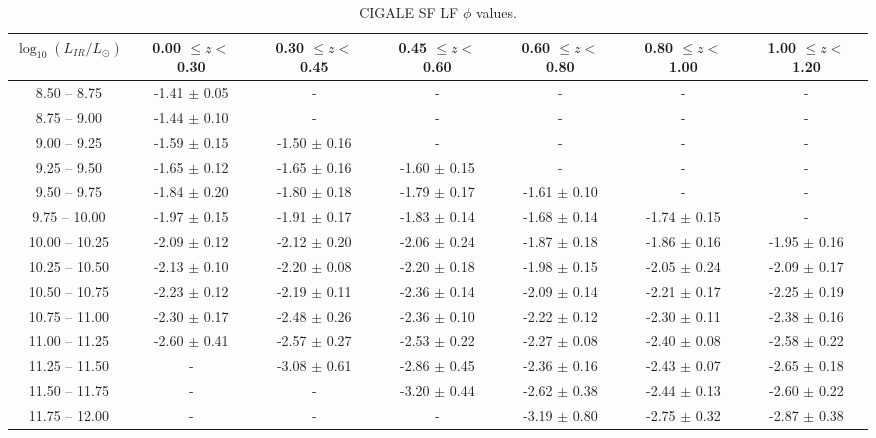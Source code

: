 \begin{table*}
    \begin{center}
    \caption{CIGALE SF LF $\phi$ values.}
    \label{Tab: CG SF LF}
    \begin{tabular}{@{}ccccccc@{}}
        \toprule
        $\log_{10}(L_{IR}/L_{\odot})$ & 0.00 $\leq z <$ 0.30 & 0.30 $\leq z <$ 0.45 & 0.45 $\leq z <$ 0.60 & 0.60 $\leq z <$ 0.80 & 0.80 $\leq z <$ 1.00 & 1.00 $\leq z <$ 1.20 \\
        \hline
         8.50 --  8.75 & -1.41 $\pm$ 0.05 & - & - & - & - & - \\
         8.75 --  9.00 & -1.44 $\pm$ 0.10 & - & - & - & - & - \\
         9.00 --  9.25 & -1.59 $\pm$ 0.15 & -1.50 $\pm$ 0.16 & - & - & - & - \\
         9.25 --  9.50 & -1.65 $\pm$ 0.12 & -1.65 $\pm$ 0.16 & -1.60 $\pm$ 0.15 & - & - & - \\
         9.50 --  9.75 & -1.84 $\pm$ 0.20 & -1.80 $\pm$ 0.18 & -1.79 $\pm$ 0.17 & -1.61 $\pm$ 0.10 & - & - \\
         9.75 -- 10.00 & -1.97 $\pm$ 0.15 & -1.91 $\pm$ 0.17 & -1.83 $\pm$ 0.14 & -1.68 $\pm$ 0.14 & -1.74 $\pm$ 0.15 & - \\
        10.00 -- 10.25 & -2.09 $\pm$ 0.12 & -2.12 $\pm$ 0.20 & -2.06 $\pm$ 0.24 & -1.87 $\pm$ 0.18 & -1.86 $\pm$ 0.16 & -1.95 $\pm$ 0.16 \\
        10.25 -- 10.50 & -2.13 $\pm$ 0.10 & -2.20 $\pm$ 0.08 & -2.20 $\pm$ 0.18 & -1.98 $\pm$ 0.15 & -2.05 $\pm$ 0.24 & -2.09 $\pm$ 0.17 \\
        10.50 -- 10.75 & -2.23 $\pm$ 0.12 & -2.19 $\pm$ 0.11 & -2.36 $\pm$ 0.14 & -2.09 $\pm$ 0.14 & -2.21 $\pm$ 0.17 & -2.25 $\pm$ 0.19 \\
        10.75 -- 11.00 & -2.30 $\pm$ 0.17 & -2.48 $\pm$ 0.26 & -2.36 $\pm$ 0.10 & -2.22 $\pm$ 0.12 & -2.30 $\pm$ 0.11 & -2.38 $\pm$ 0.16 \\
        11.00 -- 11.25 & -2.60 $\pm$ 0.41 & -2.57 $\pm$ 0.27 & -2.53 $\pm$ 0.22 & -2.27 $\pm$ 0.08 & -2.40 $\pm$ 0.08 & -2.58 $\pm$ 0.22 \\
        11.25 -- 11.50 & -                & -3.08 $\pm$ 0.61 & -2.86 $\pm$ 0.45 & -2.36 $\pm$ 0.16 & -2.43 $\pm$ 0.07 & -2.65 $\pm$ 0.18 \\
        11.50 -- 11.75 & -                & -                & -3.20 $\pm$ 0.44 & -2.62 $\pm$ 0.38 & -2.44 $\pm$ 0.13 & -2.60 $\pm$ 0.22 \\
        11.75 -- 12.00 & -                & -                & -                & -3.19 $\pm$ 0.80 & -2.75 $\pm$ 0.32 & -2.87 $\pm$ 0.38 \\

\end{tabular}
\end{center}
\end{table*}

